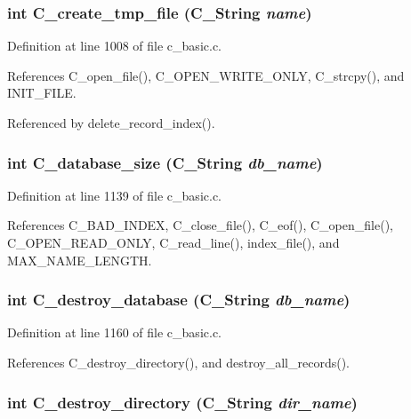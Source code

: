 \subsubsection{\setlength{\rightskip}{0pt plus 5cm}int C\_\-create\_\-tmp\_\-file (\bf{C\_\-String} {\em name})}\label{c__basic_8h_455cced69dcdf91ef61e9d74e1c0bc57}




Definition at line 1008 of file c\_\-basic.c.

References C\_\-open\_\-file(), C\_\-OPEN\_\-WRITE\_\-ONLY, C\_\-strcpy(), and INIT\_\-FILE.

Referenced by delete\_\-record\_\-index().
\subsubsection{\setlength{\rightskip}{0pt plus 5cm}int C\_\-database\_\-size (\bf{C\_\-String} {\em db\_\-name})}\label{c__basic_8h_9ec7a0a3eec5ac40c5425764bb2817b8}




Definition at line 1139 of file c\_\-basic.c.

References C\_\-BAD\_\-INDEX, C\_\-close\_\-file(), C\_\-eof(), C\_\-open\_\-file(), C\_\-OPEN\_\-READ\_\-ONLY, C\_\-read\_\-line(), index\_\-file(), and MAX\_\-NAME\_\-LENGTH.
\subsubsection{\setlength{\rightskip}{0pt plus 5cm}int C\_\-destroy\_\-database (\bf{C\_\-String} {\em db\_\-name})}\label{c__basic_8h_c1a15cb94cc3d2d9bb1f372033d37675}




Definition at line 1160 of file c\_\-basic.c.

References C\_\-destroy\_\-directory(), and destroy\_\-all\_\-records().
\subsubsection{\setlength{\rightskip}{0pt plus 5cm}int C\_\-destroy\_\-directory (\bf{C\_\-String} {\em dir\_\-name})}\label{c__basic_8h_cc30756158fa7aa162412cafbbec45c2}




